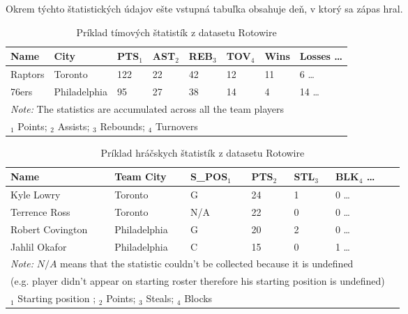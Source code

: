 Okrem týchto štatistických údajov ešte vstupná tabuľka obsahuje deň, v ktorý sa zápas hral.


\begin{table}[!b]
    \begin{tabular}{llllllll}
        \toprule
        Name    & City         & PTS$_1$ & AST$_2$ & REB$_3$ & TOV$_4$ & Wins & Losses  \dots \\
        \midrule
        Raptors & Toronto      & 122 & 22  & 42  & 12  & 11   & 6       \dots \\
        76ers   & Philadelphia & 95  & 27  & 38  & 14  & 4    & 14      \dots \\
        \bottomrule
        \multicolumn{8}{l}{\footnotesize \textit{Note:} The statistics are accumulated across all the team players} \\
        \multicolumn{8}{l}{\footnotesize $_1$ Points; $_2$ Assists; $_3$ Rebounds; $_4$ Turnovers}
    \end{tabular}
    \caption{Príklad tímových štatistík z datasetu Rotowire}\label{tab_team_stats}
\end{table}

\begin{table}[!b]
    \begin{tabular}{lllllll}
        \toprule
        Name             & Team City    & S\_POS$_1$ & PTS$_2$ & STL$_3$ & BLK$_4$        \dots \\
        \midrule
        Kyle Lowry       & Toronto      & G         & 24  & 1   & 0       \dots \\
        Terrence Ross    & Toronto      & N/A       & 22  & 0   & 0        \dots \\
        Robert Covington & Philadelphia & G         & 20  & 2   & 0        \dots \\
        Jahlil Okafor    & Philadelphia & C         & 15  & 0   & 1        \dots \\
        \bottomrule
        \multicolumn{6}{l}{\footnotesize \textit{Note:} $N/A$ means that the statistic couldn't be collected because it is undefined} \\
        \multicolumn{6}{l}{\footnotesize (e.g. player didn't appear on starting roster therefore his starting position is undefined)} \\
        \multicolumn{6}{l}{\footnotesize $_1$ Starting position ; $_2$ Points; $_3$ Steals; $_4$ Blocks}
    \end{tabular}
    \caption{Príklad hráčskych štatistík z datasetu Rotowire}\label{tab_player_stats}
\end{table}


